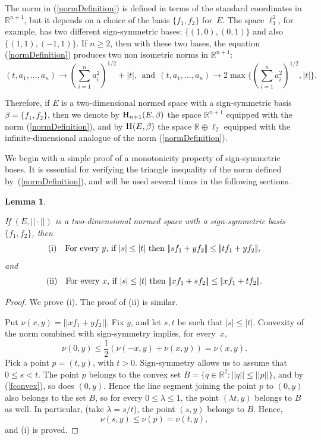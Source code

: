 \documentclass{article}[1100]
\newtheorem{lemma}[theorem]{Lemma}
\theoremstyle{definition}
\theoremstyle{remark}
\newcommand\Ren[1]{\mathbb{R}^{#1}}
\newcommand\ar{\mathbb{R}}
\newcommand\norma[1]{|\!|#1|\!|}
\newcommand\mySpaceH[1]{\textsc{H}(#1)}
\newcommand\mySpace[2]{\textsc{H}_{#1}(#2)}
\begin{document}
The norm  in (\ref{normDefinition}) is defined in terms of the standard coordinates in $\Ren{n+1}$, but it depends on a choice of
the basis $\{f_1,f_2\}$ for~$E$. The space $\ell_1^2$, for example,  has two different sign-symmetric bases: $\{(1,0),(0,1)\}$ and also $\{(1,1),(-1,1)\}$. If $n\geq 2$, then
with these two bases, the equation  (\ref{normDefinition}) produces two non isometric norms in $\Ren{n+1}$:\
\[ (t,a_1,\dots,a_n)\to (\sum_{i=1}^na_i^2)^{1/2}+|t|,\ \ \mbox{and} \ \ (t,a_1,\dots,a_n)\to 2\max\{(\sum_{i=1}^na_i^2)^{1/2}, |t|\}. \]

Therefore, if $E$ is a two-dimensional normed space with a sign-symmetric basis~$\beta=\{f_1,f_2\}$, then we denote by  $\mySpace{n+1}{E,\beta}$  
 the space $\Ren{n+1}$ equipped with the norm (\ref{normDefinition}), and by   $\mySpaceH{E,\beta}$ the space $\ar\oplus\ell_2$ equipped with  the 
 infinite-dimensional analogue of the norm (\ref{normDefinition}).
 
 \medskip

We begin with a simple proof of  a monotonicity property of sign-symmetric bases. It is essential for verifying
the triangle inequality of the norm defined by~(\ref{normDefinition}), and will be used several times in the following sections.

\begin{tcolorbox}
\begin{lemma}\label{easyLemma}

If $(E,\norma{\cdot})$ is a two-dimensional normed space with a sign-symmetric basis  $\{f_1,f_2\}$, then
\[{\rm (i)}\quad \hbox{For every $y$, if $|s|\leq |t|$ then $\norma{sf_1+yf_2}\leq \norma{tf_1+yf_2}$}, \]
and
\[{\rm (ii)}\quad \hbox{For every $x$, if $|s|\leq |t|$ then $\norma{xf_1+sf_2}\leq \norma{xf_1+tf_2}$}.\]

\end{lemma}
\end{tcolorbox}
\begin{proof}
We prove (i). The proof of (ii) is similar.

\medskip

Put $\nu(x,y)=\norma{xf_1+yf_2}$.
Fix $y$, and let $s,t$ be such that $|s|\leq |t|$. Convexity of the norm combined with sign-symmetry implies, for every~$x$,
\begin{equation}\label{fconvex}
\nu(0,y)\leq\frac{1}{2}(\nu(-x,y)+\nu(x,y))=\nu(x,y).
\end{equation}
Pick a point $p=(t,y)$, with $t>0$. Sign-symmetry allows us to assume that $0\leq s<t$. The point $p$ belongs
to the convex set $B=\{q\in\Ren{2}: \norma{q}\leq\norma{p}\}$, and by (\ref{fconvex}), so does $(0,y)$. Hence the line segment joining the point $p$ to $(0,y)$ also belongs to the set $B$, so for every $0\leq\lambda\leq 1$, the point
$(\lambda t,y)$ belongs to $B$ as well. In particular, (take $\lambda=s/t$),
the point $(s,y)$ belongs to $B$. Hence,
\[ \nu(s,y)\leq \nu(p)=\nu(t,y), \]
and (i) is proved.
\end{proof}
\end{document}
